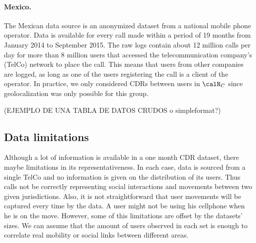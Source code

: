 \paragraph{Mexico.} The Mexican data source is an anonymized dataset from a national mobile phone operator. Data is available for every call made within a period of 19 months from January 2014 to September 2015. The raw logs contain about 12 million calls per day for more than 8 million users that accessed the telecommunication company's (TelCo) network to place the call. This means that users from other companies are logged, as long as one of the users registering the call is a client of the operator. In practice, we only considered CDRs between users in $\calN_C$ since geolocalization was only possible for this group.


(EJEMPLO DE UNA TABLA DE DATOS CRUDOS o simpleformat?)

\subsection{Data limitations}

Although a lot of information is available in a one month CDR dataset, there maybe limitations in its representativeness. In each case, data is sourced from a single TelCo and no information is given on the distribution of its users. Thus calls not be correctly representing social interactions and movements between two given jurisdictions. Also, it is not straightforward that user movements will be captured every time by the data. A user might not be using his cellphone when he is on the move.
However, some of this limitations are offset by the datasets' sizes. We can assume that the amount of users observed in each set is enough to correlate real mobility or social links between different areas.

